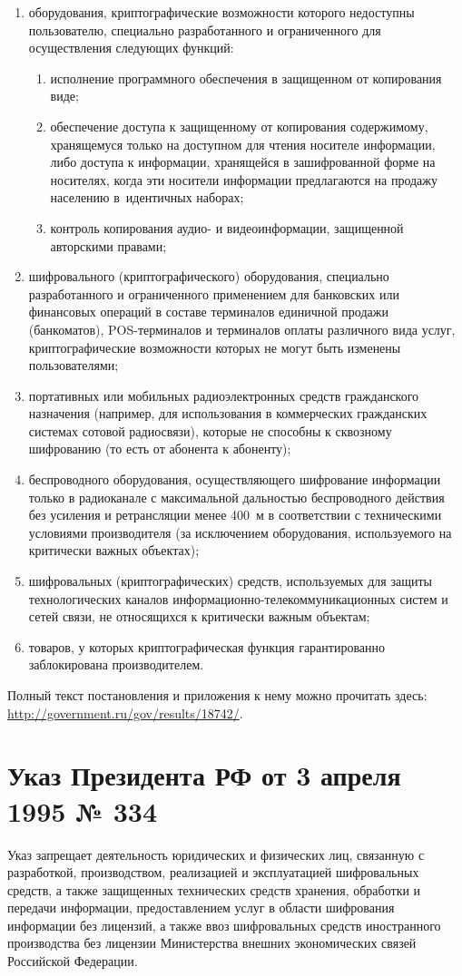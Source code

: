 \begin{enumerate}
\item оборудования, криптографические возможности которого недоступны пользователю, специально разработанного и ограниченного для осуществления следующих функций:
    \begin{enumerate}
    \item исполнение программного обеспечения в защищенном от копирования виде;
    \item обеспечение доступа к защищенному от копирования содержимому, хранящемуся только на доступном для чтения носителе информации, либо доступа к информации, хранящейся в зашифрованной форме на носителях, когда эти носители информации предлагаются на продажу населению в идентичных наборах;
    \item контроль копирования аудио- и видеоинформации, защищенной авторскими правами;
    \end{enumerate}
\item шифровального (криптографического) оборудования, специально разработанного и ограниченного применением для банковских или финансовых операций в составе терминалов единичной продажи (банкоматов), POS-терминалов и терминалов оплаты различного вида услуг, криптографические возможности которых не могут быть изменены пользователями;
\item портативных или мобильных радиоэлектронных средств гражданского назначения (например, для использования в коммерческих гражданских системах сотовой радиосвязи), которые не способны к сквозному шифрованию (то есть от абонента к абоненту);
\item беспроводного оборудования, осуществляющего шифрование информации только в радиоканале с максимальной дальностью беспроводного действия без усиления и ретрансляции менее 400 м в соответствии с техническими условиями производителя (за исключением оборудования, используемого на критически важных объектах);
\item шифровальных (криптографических) средств, используемых для защиты технологических каналов информационно-телекоммуникационных систем и сетей связи, не относящихся к критически важным объектам;
\item товаров, у которых криптографическая функция гарантированно заблокирована производителем.
\end{enumerate}
Полный текст постановления и приложения к нему можно прочитать здесь: \url{http://government.ru/gov/results/18742/}.
\section{Указ Президента РФ от 3 апреля 1995 № 334}
Указ запрещает деятельность юридических и физических лиц, связанную с разработкой, производством, реализацией и эксплуатацией шифровальных средств, а также защищенных технических средств хранения, обработки и передачи информации, предоставлением услуг в области шифрования информации без лицензий, а также ввоз шифровальных средств иностранного производства без лицензии Министерства внешних экономических связей Российской Федерации\cite{334}.
